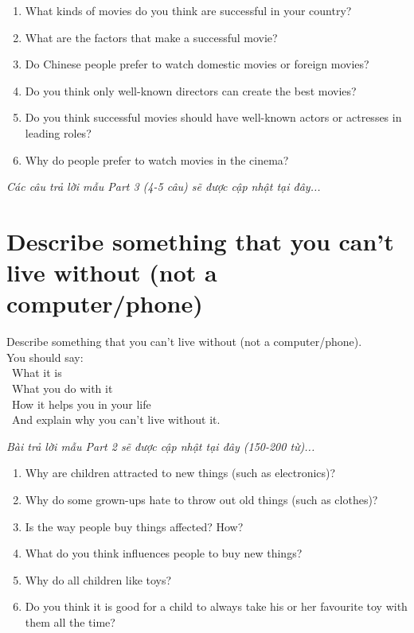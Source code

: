 \begin{ieltsprompt}
\begin{enumerate}[itemsep=4pt]
    \item What kinds of movies do you think are successful in your country?
    \item What are the factors that make a successful movie?
    \item Do Chinese people prefer to watch domestic movies or foreign movies?
    \item Do you think only well-known directors can create the best movies?
    \item Do you think successful movies should have well-known actors or actresses in leading roles?
    \item Why do people prefer to watch movies in the cinema?
\end{enumerate}
\end{ieltsprompt}

\vspace{1em}
\textit{Các câu trả lời mẫu Part 3 (4-5 câu) sẽ được cập nhật tại đây...}
\vspace{2em}

\section{Describe something that you can't live without (not a computer/phone)}
\begin{ieltsprompt}
Describe something that you can't live without (not a computer/phone). \\
You should say: \\
\textbullet\ What it is \\
\textbullet\ What you do with it \\
\textbullet\ How it helps you in your life \\
\textbullet\ And explain why you can't live without it. \\
\end{ieltsprompt}

\vspace{1em}
\textit{Bài trả lời mẫu Part 2 sẽ được cập nhật tại đây (150-200 từ)...}
\vspace{2em}

\begin{ieltsprompt}
\begin{enumerate}[itemsep=4pt]
    \item Why are children attracted to new things (such as electronics)?
    \item Why do some grown-ups hate to throw out old things (such as clothes)?
    \item Is the way people buy things affected? How?
    \item What do you think influences people to buy new things?
    \item Why do all children like toys?
    \item Do you think it is good for a child to always take his or her favourite toy with them all the time?
\end{enumerate}
\end{ieltsprompt}

